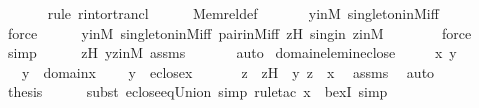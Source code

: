 \begin{isabellebody}
\ \ \ \ \ \ \isamarkupfalse%
{\isacharparenleft}{\kern0pt}rule\ r{\isacharunderscore}{\kern0pt}into{\isacharunderscore}{\kern0pt}rtrancl{\isacharparenright}{\kern0pt}\isanewline
\ \ \ \ \isamarkupfalse%
\ Memrel{\isacharunderscore}{\kern0pt}def\ \isanewline
\ \ \ \ \isamarkupfalse%
\ yinM\ singleton{\isacharunderscore}{\kern0pt}in{\isacharunderscore}{\kern0pt}M{\isacharunderscore}{\kern0pt}iff\ \isanewline
\ \ \ \ \ \ \isamarkupfalse%
\ force\isanewline
\ \ \ \ \isamarkupfalse%
\ yinM\ singleton{\isacharunderscore}{\kern0pt}in{\isacharunderscore}{\kern0pt}M{\isacharunderscore}{\kern0pt}iff\ pair{\isacharunderscore}{\kern0pt}in{\isacharunderscore}{\kern0pt}M{\isacharunderscore}{\kern0pt}iff\ zH\ singin\ zinM\ \isanewline
\ \ \ \ \ \isamarkupfalse%
\ force\isanewline
\ \ \ \ \isamarkupfalse%
\ simp\isanewline
\ \ \ \ \isamarkupfalse%
\ zH\ yzinM\ assms\ \isanewline
\ \ \ \ \isamarkupfalse%
\ auto\isanewline
{}\isamarkupfalse%
%
\endisatagproof
{\isafoldproof}%
%
\isadelimproof
\isanewline
%
\endisadelimproof
\isanewline
{}\isamarkupfalse%
\ domain{\isacharunderscore}{\kern0pt}elem{\isacharunderscore}{\kern0pt}in{\isacharunderscore}{\kern0pt}eclose\ {\isacharcolon}{\kern0pt}\ \isanewline
\ \ \ x\ y\ \isanewline
\ \ \ {\isachardoublequoteopen}y\ {\isasymin}\ domain{\isacharparenleft}{\kern0pt}x{\isacharparenright}{\kern0pt}{\isachardoublequoteclose}\ \isanewline
\ \ \ {\isachardoublequoteopen}y\ {\isasymin}\ eclose{\isacharparenleft}{\kern0pt}x{\isacharparenright}{\kern0pt}{\isachardoublequoteclose}\isanewline
%
\isadelimproof
%
\endisadelimproof
%
\isatagproof
{}\isamarkupfalse%
\ {\isacharminus}{\kern0pt}\ \isanewline
\ \ \isamarkupfalse%
\ z\ \ zH\ {\isacharcolon}{\kern0pt}\ {\isachardoublequoteopen}{\isacharless}{\kern0pt}y{\isacharcomma}{\kern0pt}\ z{\isachargreater}{\kern0pt}\ {\isasymin}\ x{\isachardoublequoteclose}\ \isamarkupfalse%
\ assms\ \isamarkupfalse%
\ auto\ \isanewline
\ \ \isamarkupfalse%
\ {\isacharquery}{\kern0pt}thesis\ \isanewline
\ \ \ \ \isamarkupfalse%
{\isacharparenleft}{\kern0pt}subst\ eclose{\isacharunderscore}{\kern0pt}eq{\isacharunderscore}{\kern0pt}Union{\isacharcomma}{\kern0pt}\ simp{\isacharcomma}{\kern0pt}\ rule{\isacharunderscore}{\kern0pt}tac\ x{\isacharequal}{\kern0pt}{}\ \ bexI{\isacharcomma}{\kern0pt}\ simp{\isacharparenright}{\kern0pt}\isanewline

\end{isabellebody}
